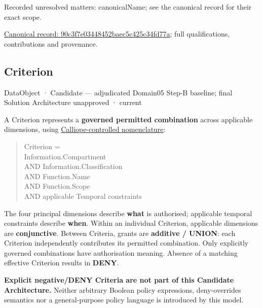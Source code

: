 {\small Recorded unresolved matters: canonicalName; see the canonical record for their exact scope.}\par
{\footnotesize \href{../../../../continuum/application/data-object/90c3f7e03448452baec5c425c34fd77a.md}{Canonical record: 90c3f7e03448452baec5c425c34fd77a}; full qualifications, contributions and provenance.}\par
\subsection{Criterion}

\label{element:b5be4886ec77466e860209443a03771b}
{\small DataObject · Candidate — adjudicated Domain05 Step-B baseline; final Solution Architecture unapproved · current}\par

A Criterion represents a \textbf{governed permitted combination} across applicable
dimensions, using \href{\detokenize{../../../../../docs/markdown/05-information-systems-architecture/component-register.md#authorisation-nomenclature}}{Calliope-controlled nomenclature}:



\begin{quote}\small\ttfamily
Criterion =\\
    Information.Compartment\\
    AND Information.Classification\\
    AND Function.Name\\
    AND Function.Scope\\
    AND applicable Temporal constraints\\

\end{quote}


The four principal dimensions describe \textbf{what} is authorised; applicable
temporal constraints describe \textbf{when}. Within an individual Criterion,
applicable dimensions are \textbf{conjunctive}. Between Criteria, grants are
\textbf{additive / UNION}: each Criterion independently contributes its permitted
combination. Only explicitly governed combinations have authorisation meaning.
Absence of a matching effective Criterion results in \textbf{DENY}.



\textbf{Explicit negative/DENY Criteria are not part of this Candidate Architecture.}
Neither arbitrary Boolean policy expressions, deny-overrides semantics nor a
general-purpose policy language is introduced by this model.


